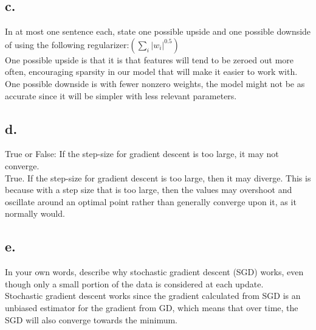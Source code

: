 \documentclass{article}
\newcommand{\1}{\mathbf{1}}
\begin{document}
{\subsection*{c.}

In at most one sentence each, state one possible upside and one possible downside of using the following regularizer:$\left(\sum_{i}\left|w_{i}\right|^{0.5}\right)$ \\

One possible upside is that it is that features will tend to be zeroed out more often, encouraging sparsity in our model that will make it easier to work with. \\ 
One possible downside is with fewer nonzero weights, the model might not be as accurate since it will be simpler with less relevant parameters.

\subsection*{d.}

True or False: If the step-size for gradient descent is too large, it may not converge. \\

True. If the step-size for gradient descent is too large, then it may diverge. This is because with a step size that is too large, then the values may overshoot and oscillate around an optimal point rather than generally converge upon it, as it normally would.

\subsection*{e.}

In your own words, describe why stochastic gradient descent (SGD) works, even though only a small portion of the data is considered at each update. \\

Stochastic gradient descent works since the gradient calculated from SGD is an unbiased estimator for the gradient from GD, which means that over time, the SGD will also converge towards the minimum.

}
\end{document}

